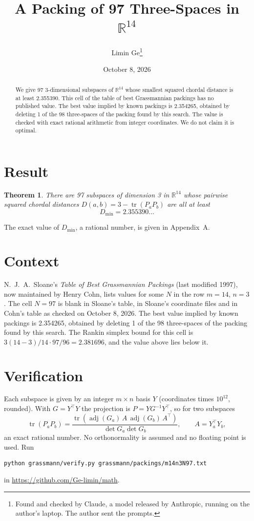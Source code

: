 \documentclass[11pt,a4paper]{article}
\title{A Packing of 97 Three-Spaces in $\mathbb{R}^{14}$}
\author{Limin Ge\thanks{Found and checked by Claude, a model released by Anthropic, running on the author's laptop. The author sent the prompts.}}
\date{October 8, 2026}
\newtheorem*{theorem}{Theorem}
\begin{document}
\maketitle
\begin{abstract}
We give 97 3-dimensional subspaces of $\mathbb{R}^{14}$ whose smallest squared chordal distance is at least 2.355390. This cell of the table of best Grassmannian packings has no published value. The best value implied by known packings is 2.354265, obtained by deleting 1 of the 98 three-spaces of the packing found by this search. The value is checked with exact rational arithmetic from integer coordinates. We do not claim it is optimal.
\end{abstract}

\section{Result}
\begin{theorem}
There are 97 subspaces of dimension 3 in $\mathbb{R}^{14}$ whose pairwise squared chordal distances $D(a,b) = 3 - \operatorname{tr}(P_aP_b)$ are all at least
\[ D_{\min} = 2.355390\ldots \]
\end{theorem}
The exact value of $D_{\min}$, a rational number, is given in Appendix~A.


\section{Context}
N.~J.~A.~Sloane's \emph{Table of Best Grassmannian Packings} (last modified 1997), now maintained by Henry Cohn, lists values for some $N$ in the row $m=14$, $n=3$. The cell $N=97$ is blank in Sloane's table, in Sloane's coordinate files and in Cohn's table as checked on October 8, 2026. The best value implied by known packings is 2.354265, obtained by deleting 1 of the 98 three-spaces of the packing found by this search. The Rankin simplex bound for this cell is $3(14-3)/14\cdot 97/96 = 2.381696$, and the value above lies below it.


\section{Verification}
Each subspace is given by an integer $m\times n$ basis $Y$ (coordinates times $10^{12}$, rounded). With $G=Y^\top Y$ the projection is $P=YG^{-1}Y^\top$, so for two subspaces
\[ \operatorname{tr}(P_aP_b)=\frac{\operatorname{tr}(\operatorname{adj}(G_a)\,A\,\operatorname{adj}(G_b)\,A^\top)}{\det G_a\det G_b},\qquad A=Y_a^\top Y_b, \]
an exact rational number. No orthonormality is assumed and no floating point is used. Run
\begin{verbatim}
python grassmann/verify.py grassmann/packings/m14n3N97.txt
\end{verbatim}
in \url{https://github.com/Ge-limin/math}.
\end{document}

